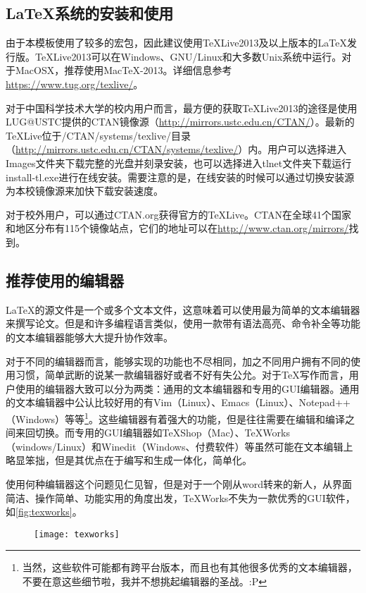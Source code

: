 \subsection{\texorpdfstring{\LaTeX}{LaTeX}系统的安装和使用}
由于本模板使用了较多的宏包，因此建议使用TeXLive2013及以上版本的\LaTeX 发行版。TeXLive2013可以在Windows、GNU/Linux和大多数Unix系统中运行。对于MacOSX，推荐使用MacTeX-2013。详细信息参考\url{https://www.tug.org/texlive/}。

对于中国科学技术大学的校内用户而言，最方便的获取TeXLive2013的途径是使用LUG@USTC提供的CTAN镜像源（\url{http://mirrors.ustc.edu.cn/CTAN/}）。最新的TeXLive位于/CTAN/systems/texlive/目录（\url{http://mirrors.ustc.edu.cn/CTAN/systems/texlive/}）内。用户可以选择进入Images文件夹下载完整的光盘并刻录安装，也可以选择进入tlnet文件夹下载运行install-tl.exe进行在线安装。需要注意的是，在线安装的时候可以通过切换安装源为本校镜像源来加快下载安装速度。

对于校外用户，可以通过CTAN.org获得官方的TeXLive。CTAN在全球41个国家和地区分布有115个镜像站点，它们的地址可以在\url{http://www.ctan.org/mirrors/}找到。

\subsection{推荐使用的编辑器}
\LaTeX 的源文件是一个或多个文本文件，这意味着可以使用最为简单的文本编辑器来撰写论文。但是和许多编程语言类似，使用一款带有语法高亮、命令补全等功能的文本编辑器能够大大提升协作效率。

对于不同的编辑器而言，能够实现的功能也不尽相同，加之不同用户拥有不同的使用习惯，简单武断的说某一款编辑器好或者不好有失公允。对于\TeX 写作而言，用户使用的编辑器大致可以分为两类：通用的文本编辑器和专用的GUI编辑器。通用的文本编辑器中公认比较好用的有Vim（Linux）、Emacs（Linux）、Notepad++（Windows）等等\footnote{当然，这些软件可能都有跨平台版本，而且也有其他很多优秀的文本编辑器，不要在意这些细节啦，我并不想挑起编辑器的圣战。:P}。这些编辑器有着强大的功能，但是往往需要在编辑和编译之间来回切换。而专用的GUI编辑器如TeXShop（Mac）、TeXWorks（windows/Linux）和Winedit（Windows、付费软件）等虽然可能在文本编辑上略显笨拙，但是其优点在于编写和生成一体化，简单化。

使用何种编辑器这个问题见仁见智，但是对于一个刚从word转来的新人，从界面简洁、操作简单、功能实用的角度出发，TeXWorks不失为一款优秀的GUI软件，如\autoref{fig:texworks}。

\begin{figure}
\centering
\texttt{[image: texworks]}
\label{fig:texworks}
\end{figure}

